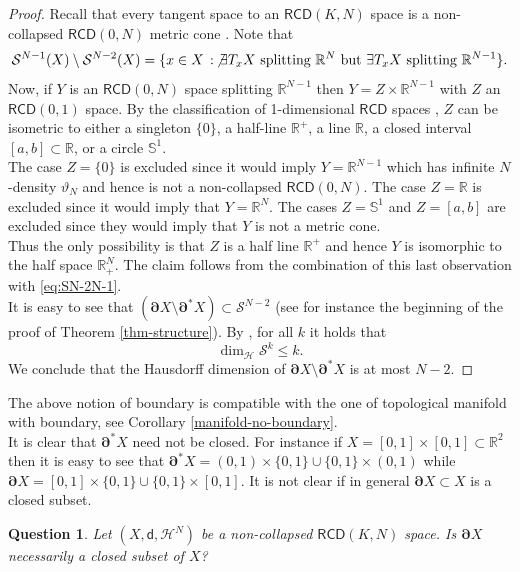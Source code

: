 \documentclass[a4paper]{amsart}
\theoremstyle{plain}
\newtheorem{question}[lemma]{Question}
\theoremstyle{definition}
\numberwithin{equation}{section}
\newcommand{\R}{\mathbb{R}}
\renewcommand{\S}{\mathcal{S}}
\newcommand{\RCD}{\mathsf{RCD}}
\newcommand{\sfd}{\mathsf d}
\newcommand{\cS}{\mathcal{S}}
\newcommand{\cH}{\mathcal{H}}
\newcommand{\bRCD}{\boldsymbol\partial}
\begin{document}
{\begin{proof}
Recall that every tangent space to an $\RCD(K,N)$ space is a non-collapsed  $\RCD(0,N)$ metric cone \cite[Proposition 2.8]{GDPNonColl}. 
Note that
\begin{equation}\label{eq:SN-2N-1}
\S^{N-1}(X)\setminus \S^{N-2}(X)=\{x\in X\,:\, \not \exists T_{x}X \text{ splitting } \R^{N} \text{ but } \exists T_{x}X \text{ splitting } \R^{N-1}\}.
\end{equation}
Now, if $Y$ is an $\RCD(0,N)$ space splitting $\R^{N-1}$ then $Y=Z\times \R^{N-1}$ with $Z$ an $\RCD(0,1)$ space. By the classification of 1-dimensional $\RCD$ spaces \cite{KL}, $Z$ can be isometric to either a singleton $\{0\}$, a half-line $\R^{+}$, a line $\R$, a closed interval  $[a,b]\subset \R$, or a circle ${\mathbb S}^{1}$. 
\\The case $Z=\{0\}$ is excluded since it would imply $Y=\R^{N-1}$ which has infinite $N$-density  $\vartheta_{N}$ and hence is not a non-collapsed $\RCD(0,N)$. The case $Z=\R$ is excluded since it would imply that $Y=\R^{N}$. The cases $Z={\mathbb S}^{1}$ and  $Z=[a,b]$ are excluded since they would imply that 
$Y$ is not a metric cone. 
\\ Thus the only possibility is that $Z$ is a half line $\R^{+}$ and hence $Y$ is isomorphic to the half space $\R^N_+$.
The claim follows from the combination of this last observation with \eqref{eq:SN-2N-1}.
\\{  It is easy to see that  $(\bRCD X \setminus \bRCD^* X)\subset \cS^{N-2}$ (see for instance the beginning of the proof of Theorem \ref{thm-structure}).   By \cite[Theorem  1.8]{GDPNonColl}, for all $k$ it holds that
\begin{equation}\label{H-dim-Sk}
\dim_{\mathcal H}\cS^{k}\le k.
\end{equation}
We conclude that the Hausdorff dimension of  $\bRCD X \setminus \bRCD^* X$ is at most $N-2$.}
\end{proof}


The above notion of boundary  is compatible with the one of topological manifold with boundary, see  Corollary \autoref{manifold-no-boundary}.
\\It is clear that $\bRCD^*X$ need not be closed. For instance if $X=[0,1]\times[0,1]\subset \R^{2}$ then it is easy to see that $\bRCD^*X=(0,1)\times\{0,1\}\cup \{0,1\}\times(0,1)$ while $\bRCD X=[0,1]\times\{0,1\}\cup \{0,1\}\times[0,1]$. It is not clear if in general $\bRCD X\subset X$ is a closed subset.

\begin{question}
 Let $(X,\sfd,\cH^{N})$ be a non-collapsed $\RCD(K,N)$ space.  Is $\bRCD X$ necessarily a closed subset of $X$?
 \end{question}


}
\end{document}
